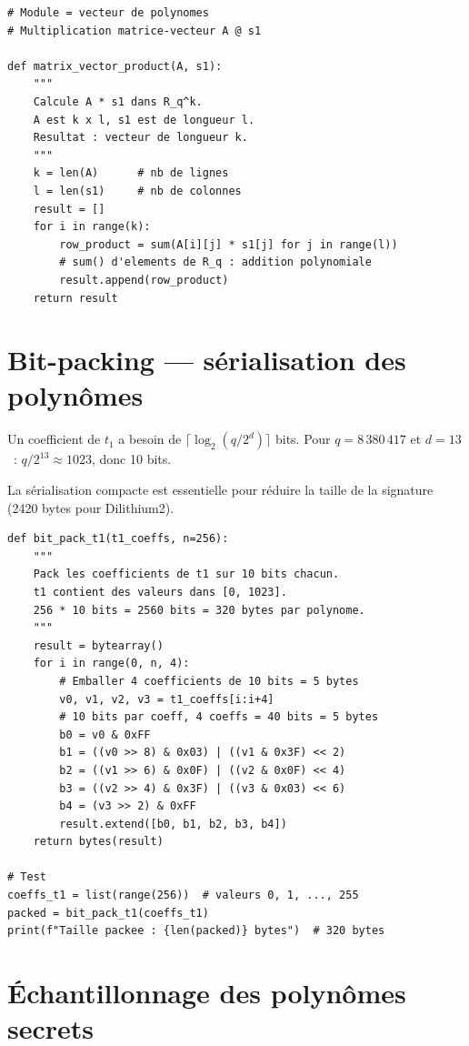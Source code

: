\documentclass[12pt, a4paper]{article}
\begin{document}
\begin{lstlisting}[style=python]
# Module = vecteur de polynomes
# Multiplication matrice-vecteur A @ s1

def matrix_vector_product(A, s1):
    """
    Calcule A * s1 dans R_q^k.
    A est k x l, s1 est de longueur l.
    Resultat : vecteur de longueur k.
    """
    k = len(A)      # nb de lignes
    l = len(s1)     # nb de colonnes
    result = []
    for i in range(k):
        row_product = sum(A[i][j] * s1[j] for j in range(l))
        # sum() d'elements de R_q : addition polynomiale
        result.append(row_product)
    return result
\end{lstlisting}

\section{Bit-packing --- sérialisation des polynômes}

Un coefficient de $t_1$ a besoin de $\lceil \log_2(q/2^d) \rceil$ bits.
Pour $q = 8\,380\,417$ et $d = 13$~: $q/2^{13} \approx 1023$, donc 10 bits.

La sérialisation compacte est essentielle pour réduire la taille de la
signature (2420 bytes pour Dilithium2).

\begin{lstlisting}[style=python]
def bit_pack_t1(t1_coeffs, n=256):
    """
    Pack les coefficients de t1 sur 10 bits chacun.
    t1 contient des valeurs dans [0, 1023].
    256 * 10 bits = 2560 bits = 320 bytes par polynome.
    """
    result = bytearray()
    for i in range(0, n, 4):
        # Emballer 4 coefficients de 10 bits = 5 bytes
        v0, v1, v2, v3 = t1_coeffs[i:i+4]
        # 10 bits par coeff, 4 coeffs = 40 bits = 5 bytes
        b0 = v0 & 0xFF
        b1 = ((v0 >> 8) & 0x03) | ((v1 & 0x3F) << 2)
        b2 = ((v1 >> 6) & 0x0F) | ((v2 & 0x0F) << 4)
        b3 = ((v2 >> 4) & 0x3F) | ((v3 & 0x03) << 6)
        b4 = (v3 >> 2) & 0xFF
        result.extend([b0, b1, b2, b3, b4])
    return bytes(result)

# Test
coeffs_t1 = list(range(256))  # valeurs 0, 1, ..., 255
packed = bit_pack_t1(coeffs_t1)
print(f"Taille packee : {len(packed)} bytes")  # 320 bytes
\end{lstlisting}

\section{Échantillonnage des polynômes secrets}
\end{document}
